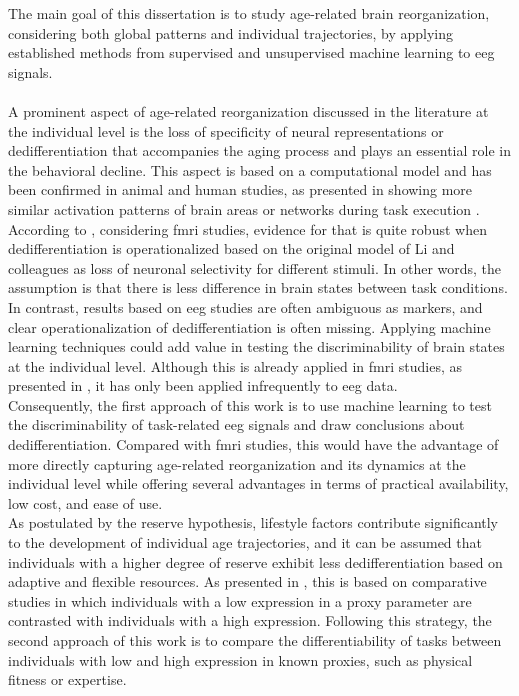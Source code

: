 The main goal of this dissertation is to study age-related brain reorganization, considering both global patterns and individual trajectories, by applying established methods from supervised and unsupervised machine learning to \gls{eeg} signals.\\
\\
A prominent aspect of age-related reorganization discussed in the literature at the individual level is the loss of specificity of neural representations or dedifferentiation that accompanies the aging process and plays an essential role in the behavioral decline. This aspect is based on a computational model and has been confirmed in animal and human studies, as presented in  showing more similar activation patterns of brain areas or networks during task execution \cite{Carb2011, Rieck2021, Antonenko2013, Geerligs2014}. According to \citeauthor{Koen2019}, considering \gls{fmri} studies, evidence for that is quite robust when dedifferentiation is operationalized based on the original model of Li and colleagues \cite{Li2001,Li2002} as loss of neuronal selectivity for different stimuli. In other words, the assumption is that there is less difference in brain states between task conditions. In contrast, results based on \gls{eeg} studies are often ambiguous as markers, and clear operationalization of dedifferentiation is often missing. Applying machine learning techniques could add value in testing the discriminability of brain states at the individual level. Although this is already applied in \gls{fmri} studies, as presented in , it has only been applied infrequently to \gls{eeg} data.\\
Consequently, the first approach of this work is to use machine learning to test the discriminability of task-related \gls{eeg} signals and draw conclusions about dedifferentiation. Compared with \gls{fmri} studies, this would have the advantage of more directly capturing age-related reorganization and its dynamics at the individual level while offering several advantages in terms of practical availability, low cost, and ease of use.\\
As postulated by the reserve hypothesis, lifestyle factors contribute significantly to the development of individual age trajectories, and it can be assumed that individuals with a higher degree of reserve exhibit less dedifferentiation based on adaptive and flexible resources. As presented in , this is based on comparative studies in which individuals with a low expression in a proxy parameter are contrasted with individuals with a high expression. Following this strategy, the second approach of this work is to compare the differentiability of tasks between individuals with low and high expression in known proxies, such as physical fitness or expertise.\\
